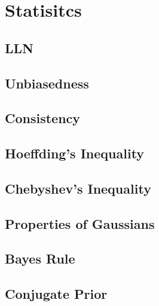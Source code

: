 \documentclass[18pt,a3paper,landscape, ncols=3]{cheatsheet}
\begin{document}

\section{Statisitcs} \seperator
	\subsection{LLN}
		\begin{mdframed}
		\end{mdframed}
	\subsection{Unbiasedness}
		\begin{mdframed}
		\end{mdframed}
	\subsection{Consistency}
		\begin{mdframed}
		\end{mdframed}
	\subsection{Hoeffding's Inequality}
		\begin{mdframed}
		\end{mdframed}
	\subsection{Chebyshev's Inequality}
		\begin{mdframed}
		\end{mdframed}
	\subsection{Properties of Gaussians}
		\begin{mdframed}
		\end{mdframed}
	\subsection{Bayes Rule} %
		\begin{mdframed}
		\end{mdframed}
	\subsection{Conjugate Prior}
		\begin{mdframed}
		\end{mdframed}
	
\end{document}
